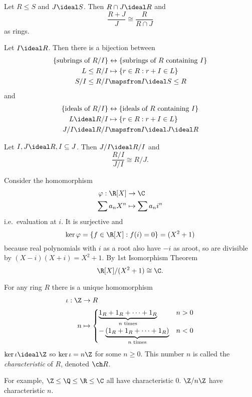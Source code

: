\documentclass[a4paper]{article}
\theoremstyle{definition}
\begin{document}
\begin{theorem}
  Let \(R \leq S\) and \(J \ideal S\). Then \(R \cap J \ideal R\) and
  \[
    \frac{R + J}{J} \cong \frac{R}{R \cap J}
  \]
  as rings.
\end{theorem}

\begin{theorem}
  Let \(I \ideal R\). Then there is a bijection between
  \begin{align*}
    \{\text{subrings of } R/I\} &\leftrightarrow \{\text{subrings of } R \text{ containing } I\} \\
    L \leq R/I &\mapsto \{r \in R: r + I \in L\} \\
    S/I \leq R/I &\mapsfrom I \ideal S \leq R
  \end{align*}
  and
  \begin{align*}
    \{\text{ideals of } R/I\} &\leftrightarrow \{\text{ideals of } R \text{ containing } I\} \\
    L \ideal R/I &\mapsto \{r \in R: r + I \in L\} \\
    J/I \ideal R/I &\mapsfrom I \ideal J \ideal R
  \end{align*}
\end{theorem}

\begin{theorem}
  Let \(I, J \ideal R, I \subseteq J\). Then \(J/I \ideal R/I\) and
  \[
    \frac{R/I}{J/I} \cong R/J.
  \]
\end{theorem}

\begin{eg}
  Consider the homomorphism
  \begin{align*}
    \varphi: \R[X] &\to \C \\
    \sum a_nX^n &\mapsto \sum a_n i^n
  \end{align*}
  i.e.\ evaluation at \(i\). It is surjective and
  \[
    \ker \varphi = \{f \in \R[X]: f(i) = 0\} = (X^2 + 1)
  \]
  because real polynomials with \(i\) as a root also have \(-i\) as aroot, so are divisible by \((X - i)(X + i) = X^2 + 1\). By 1st Isomorphism Theorem
  \[
    \R[X]/(X^2 + 1) \cong \C.
  \]
\end{eg}

\begin{eg}
  For any ring \(R\) there is a unique homomorphism
  \begin{align*}
    \iota: \Z &\to R \\
    n &\mapsto
        \begin{cases}
          \underbrace{1_R + 1_R + \dots + 1_R}_{n \text{ times}} & n > 0 \\
          -\underbrace{(1_R + 1_R + \dots + 1_R)}_{n \text{ times}} & n < 0
        \end{cases}
  \end{align*}
  \(\ker \iota \ideal \Z\) so \(\ker \iota = n\Z\) for some \(n \geq 0\). This number \(n\) is called the \emph{characteristic} of \(R\), denoted \(\ch R\).

  For example, \(\Z \leq \Q \leq \R \leq \C\) all have characteristic \(0\). \(\Z/n\Z\) have characteristic \(n\).
\end{eg}
\end{document}
